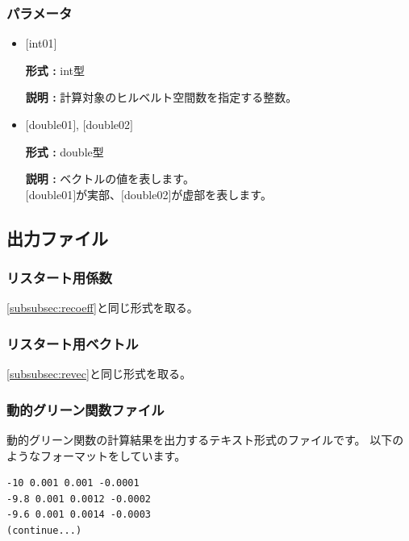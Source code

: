 \documentclass[12pt,titlepage]{jarticle}
\begin{document}
\subsubsection{パラメータ}
 \begin{itemize}

  \item  $[$int01$]$

 {\bf 形式 :} int型

{\bf 説明 :} 計算対象のヒルベルト空間数を指定する整数。
 
 \item  $[$double01$]$, $[$double02$]$

 {\bf 形式 :} double型 

{\bf 説明 :} ベクトルの値を表します。\\
$[$double01$]$が実部、$[$double02$]$が虚部を表します。\\
\end{itemize}


\newpage
\subsection{出力ファイル}
\subsubsection{リスタート用係数}\label{subsubsec:ResCoef}
\ref{subsubsec:recoeff}と同じ形式を取る。
\subsubsection{リスタート用ベクトル}\label{subsubsec:ResVec}
\ref{subsubsec:revec}と同じ形式を取る。
\subsubsection{動的グリーン関数ファイル}\label{subsubsec:DynamicalG}

動的グリーン関数の計算結果を出力するテキスト形式のファイルです。
以下のようなフォーマットをしています。
\\
\begin{minipage}{10cm}
\begin{screen}
\begin{verbatim}
-10 0.001 0.001 -0.0001 
-9.8 0.001 0.0012 -0.0002
-9.6 0.001 0.0014 -0.0003
(continue...)
\end{verbatim}
\end{screen}
\end{minipage}
\end{document}
